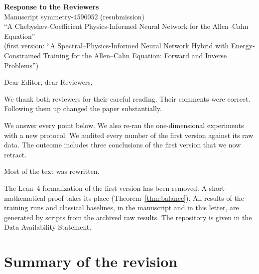\documentclass[11pt]{article}
\begin{document}
\begin{center}
{\large\bfseries Response to the Reviewers}\\[4pt]
Manuscript symmetry-4596052 (resubmission)\\[2pt]
``A Chebyshev-Coefficient Physics-Informed Neural Network for the Allen--Cahn Equation''\\
(first version: ``A Spectral--Physics-Informed Neural Network Hybrid with Energy-Constrained Training for the Allen--Cahn Equation: Forward and Inverse Problems'')
\end{center}

\medskip
Dear Editor, dear Reviewers,

We thank both reviewers for their careful reading. Their comments were correct. Following them up changed the paper substantially.

We answer every point below. We also re-ran the one-dimensional experiments with a new protocol. We audited every number of the first version against its raw data. The outcome includes three conclusions of the first version that we now retract.

Most of the text was rewritten.

The Lean~4 formalization of the first version has been removed. A short mathematical proof takes its place (Theorem~\ref{thm:balance}). All results of the training runs and classical baselines, in the manuscript and in this letter, are generated by scripts from the archived raw results. The repository is given in the Data Availability Statement.

\section*{Summary of the revision}
\end{document}
